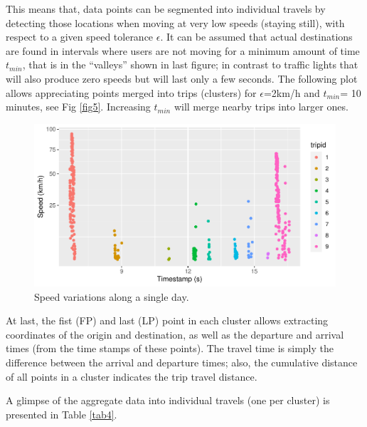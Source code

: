 \documentclass[runningheads]{llncs}
\begin{document}
This means that, data points can be segmented into individual travels by detecting those locations when moving at very low speeds (staying still), with respect to a given speed tolerance \(\epsilon\). It can be assumed that actual destinations are found in intervals where users are not moving for a minimum amount of time \(t_{min}\), that is in the ``valleys'' shown in last figure; in contrast to traffic lights that will also produce zero speeds but will last only a few seconds. The following plot allows appreciating points merged into trips (clusters) for \(\epsilon\)=2km/h and \(t_{min}\)= 10 minutes, see Fig \ref{fig5}. Increasing \(t_{min}\) will merge nearby trips into larger ones.

\begin{figure}

{\centering \includegraphics{conlatex_files/figure-latex/speed-hour2-plot-1} 

}

\caption{\label{fig5}Speed variations along a single day.}\label{fig:speed-hour2-plot}
\end{figure}

At last, the fist (FP) and last (LP) point in each cluster allows extracting coordinates of the origin and destination, as well as the departure and arrival times (from the time stamps of these points). The travel time is simply the difference between the arrival and departure times; also, the cumulative distance of all points in a cluster indicates the trip travel distance.

A glimpse of the aggregate data into individual travels (one per cluster) is presented in Table \ref{tab4}.
\end{document}
